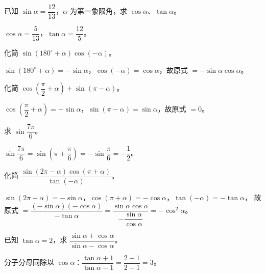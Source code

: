 \begin{problem}
已知 $\sin\alpha=\dfrac{12}{13}$，$\alpha$ 为第一象限角，求 $\cos\alpha$、$\tan\alpha$。
\end{problem}
\begin{solution}
$\cos\alpha=\dfrac5{13}$，$\tan\alpha=\dfrac{12}{5}$。
\end{solution}

\begin{problem}
化简 $\sin(180^\circ+\alpha)\cos(-\alpha)$。
\end{problem}
\begin{solution}
$\sin(180^\circ+\alpha)=-\sin\alpha$，$\cos(-\alpha)=\cos\alpha$，故原式 $=-\sin\alpha\cos\alpha$。
\end{solution}

\begin{problem}
化简 $\cos\left(\dfrac{\pi}{2}+\alpha\right)+\sin(\pi-\alpha)$。
\end{problem}
\begin{solution}
$\cos\left(\dfrac{\pi}{2}+\alpha\right)=-\sin\alpha$，$\sin(\pi-\alpha)=\sin\alpha$，故原式 $=0$。
\end{solution}

\begin{problem}
求 $\sin\dfrac{7\pi}{6}$。
\end{problem}
\begin{solution}
$\sin\dfrac{7\pi}{6}=\sin\left(\pi+\dfrac{\pi}{6}\right)=-\sin\dfrac{\pi}{6}=-\dfrac12$。
\end{solution}

\begin{problem}
化简 $\dfrac{\sin(2\pi-\alpha)\cos(\pi+\alpha)}{\tan(-\alpha)}$。
\end{problem}
\begin{solution}
$\sin(2\pi-\alpha)=-\sin\alpha$，$\cos(\pi+\alpha)=-\cos\alpha$，$\tan(-\alpha)=-\tan\alpha$，
故原式 $=\dfrac{(-\sin\alpha)(-\cos\alpha)}{-\tan\alpha}
=\dfrac{\sin\alpha\cos\alpha}{-\dfrac{\sin\alpha}{\cos\alpha}}=-\cos^2\alpha$。
\end{solution}

\begin{problem}
已知 $\tan\alpha=2$，求 $\dfrac{\sin\alpha+\cos\alpha}{\sin\alpha-\cos\alpha}$。
\end{problem}
\begin{solution}
分子分母同除以 $\cos\alpha$：$\dfrac{\tan\alpha+1}{\tan\alpha-1}=\dfrac{2+1}{2-1}=3$。
\end{solution}


